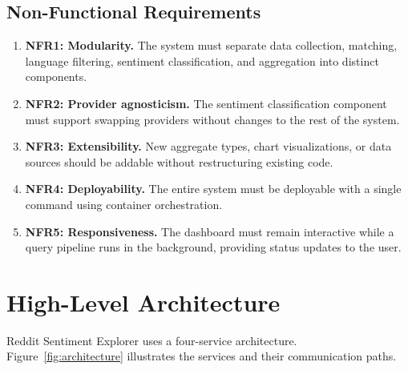 \subsection{Non-Functional Requirements}

\begin{enumerate}
    \item \textbf{NFR1: Modularity.} The system must separate data collection, matching, language filtering, sentiment classification, and aggregation into distinct components.
    \item \textbf{NFR2: Provider agnosticism.} The sentiment classification component must support swapping providers without changes to the rest of the system.
    \item \textbf{NFR3: Extensibility.} New aggregate types, chart visualizations, or data sources should be addable without restructuring existing code.
    \item \textbf{NFR4: Deployability.} The entire system must be deployable with a single command using container orchestration.
    \item \textbf{NFR5: Responsiveness.} The dashboard must remain interactive while a query pipeline runs in the background, providing status updates to the user.
\end{enumerate}

\section{High-Level Architecture}
\label{sec:architecture}

Reddit Sentiment Explorer uses a four-service architecture. Figure~\ref{fig:architecture} illustrates the services and their communication paths.

